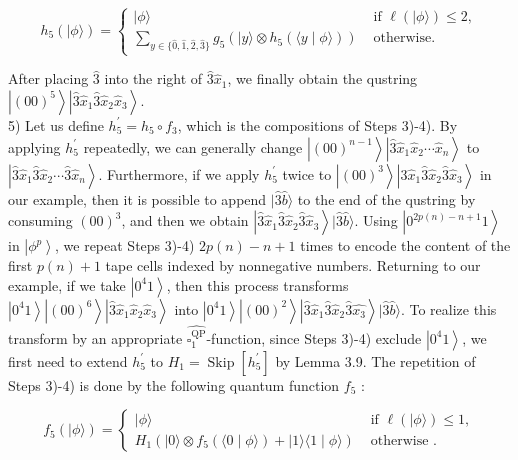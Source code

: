 \documentclass[10pt]{article}
\begin{document}
$$
h_{5}(|\phi\rangle)= \begin{cases}|\phi\rangle & \text { if } \ell(|\phi\rangle) \leq 2, \\ \sum_{y \in\{\hat{0}, \hat{1}, \hat{2}, \hat{3}\}} g_{5}\left(|y\rangle \otimes h_{5}(\langle y \mid \phi\rangle)\right) & \text { otherwise. }\end{cases}
$$

After placing $\hat{3}$ into the right of $\hat{3} \hat{x}_{1}$, we finally obtain the qustring $\left|(00)^{5}\right\rangle\left|\hat{3} \hat{x}_{1} \hat{3} \hat{x}_{2} \hat{x}_{3}\right\rangle$.\\
5) Let us define $h_{5}^{\prime}=h_{5} \circ f_{3}$, which is the compositions of Steps 3)-4). By applying $h_{5}^{\prime}$ repeatedly, we can generally change $\left|(00)^{n-1}\right\rangle\left|\hat{3} \hat{x}_{1} \hat{x}_{2} \cdots \hat{x}_{n}\right\rangle$ to $\left|\hat{3} \hat{x}_{1} \hat{3} \hat{x}_{2} \cdots \hat{3} \hat{x}_{n}\right\rangle$. Furthermore, if we apply $h_{5}^{\prime}$ twice to $\left|(00)^{3}\right\rangle\left|\hat{3} \hat{x}_{1} \hat{3} \hat{x}_{2} \hat{3} \hat{x}_{3}\right\rangle$ in our example, then it is possible to append $|\hat{3} \hat{b}\rangle$ to the end of the qustring by consuming $(00)^{3}$, and then we obtain $\left|\hat{3} \hat{x}_{1} \hat{3} \hat{x}_{2} \hat{3} \hat{x}_{3}\right\rangle|\hat{3} \hat{b}\rangle$. Using $\left|0^{2 p(n)-n+1} 1\right\rangle$ in $\left|\phi^{p}\right\rangle$, we repeat Steps 3)-4) $2 p(n)-n+1$ times to encode the content of the first $p(n)+1$ tape cells indexed by nonnegative numbers. Returning to our example, if we take $\left|0^{4} 1\right\rangle$, then this process transforms $\left|0^{4} 1\right\rangle\left|(00)^{6}\right\rangle\left|\hat{3} \hat{x}_{1} \hat{x}_{2} \hat{x}_{3}\right\rangle$ into $\left|0^{4} 1\right\rangle\left|(00)^{2}\right\rangle\left|\hat{3} \hat{x}_{1} \hat{3} \hat{x}_{2} \hat{3} \hat{x_{3}}\right\rangle|\hat{3} \hat{b}\rangle$. To realize this transform by an appropriate $\widehat{\square_{1}^{\mathrm{QP}}}$-function, since Steps 3)-4) exclude $\left|0^{4} 1\right\rangle$, we first need to extend $h_{5}^{\prime}$ to $H_{1}=\operatorname{Skip}\left[h_{5}^{\prime}\right]$ by Lemma 3.9. The repetition of Steps 3)-4) is done by the following quantum function $f_{5}$ :

$$
f_{5}(|\phi\rangle)= \begin{cases}|\phi\rangle & \text { if } \ell(|\phi\rangle) \leq 1, \\ H_{1}\left(|0\rangle \otimes f_{5}(\langle 0 \mid \phi\rangle)+|1\rangle\langle 1 \mid \phi\rangle\right) & \text { otherwise } .\end{cases}
$$
\end{document}
